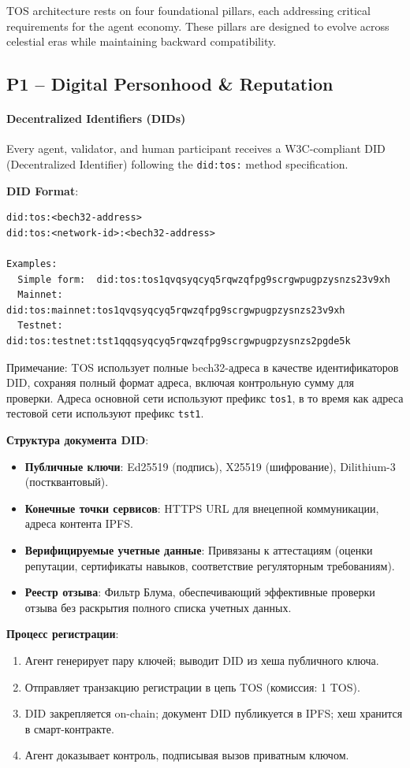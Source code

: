 \documentclass[11pt]{article}
\begin{document}
TOS architecture rests on four foundational pillars, each addressing critical requirements for the agent economy. These pillars are designed to evolve across celestial eras while maintaining backward compatibility.

\subsection{P1 -- Digital Personhood \& Reputation}
\label{sec:pillar-identity}

\paragraph{Decentralized Identifiers (DIDs)}
Every agent, validator, and human participant receives a W3C-compliant DID (Decentralized Identifier) following the \texttt{did:tos:} method specification.

\textbf{DID Format}:
\begin{verbatim}
did:tos:<bech32-address>
did:tos:<network-id>:<bech32-address>

Examples:
  Simple form:  did:tos:tos1qvqsyqcyq5rqwzqfpg9scrgwpugpzysnzs23v9xh
  Mainnet:      did:tos:mainnet:tos1qvqsyqcyq5rqwzqfpg9scrgwpugpzysnzs23v9xh
  Testnet:      did:tos:testnet:tst1qqqsyqcyq5rqwzqfpg9scrgwpugpzysnzs2pgde5k
\end{verbatim}
Примечание: TOS использует полные bech32-адреса в качестве идентификаторов DID, сохраняя полный формат адреса, включая контрольную сумму для проверки. Адреса основной сети используют префикс \texttt{tos1}, в то время как адреса тестовой сети используют префикс \texttt{tst1}.

\textbf{Структура документа DID}:
\begin{itemize}[noitemsep]
  \item \textbf{Публичные ключи}: Ed25519 (подпись), X25519 (шифрование), Dilithium-3 (постквантовый).
  \item \textbf{Конечные точки сервисов}: HTTPS URL для внецепной коммуникации, адреса контента IPFS.
  \item \textbf{Верифицируемые учетные данные}: Привязаны к аттестациям (оценки репутации, сертификаты навыков, соответствие регуляторным требованиям).
  \item \textbf{Реестр отзыва}: Фильтр Блума, обеспечивающий эффективные проверки отзыва без раскрытия полного списка учетных данных.
\end{itemize}

\textbf{Процесс регистрации}:
\begin{enumerate}[noitemsep]
  \item Агент генерирует пару ключей; выводит DID из хеша публичного ключа.
  \item Отправляет транзакцию регистрации в цепь TOS (комиссия: 1 TOS).
  \item DID закрепляется on-chain; документ DID публикуется в IPFS; хеш хранится в смарт-контракте.
  \item Агент доказывает контроль, подписывая вызов приватным ключом.
\end{enumerate}
\end{document}

